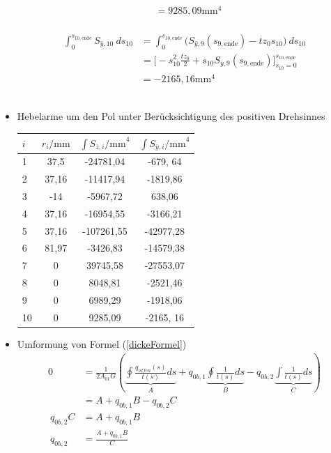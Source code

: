 \begin{itemize}
\begin{equation}
\begin{split}
			&=9285,09\mathrm{mm}^4
		\end{split}
	\end{equation}\\
	\begin{equation}
		\begin{split}
			\int_{0}^{s_{10,\mathrm{ende}}} S_{\bar y,10}\ ds_{10} &= \int_{0}^{s_{10,\mathrm{ende}}}\bigg(S_{\bar y,9}(s_{9,\mathrm{ende}})-tz_0s_{10}\bigg)\ ds_{10}\\\
			&=\bigg[-s_{10}^2\frac{tz_0}{2}+s_{10}S_{\bar y,9}(s_{9,\mathrm{ende}})\bigg]_{s_{10}=0}^{s_{10,\mathrm{ende}}}\\\
			&=-2165,16\mathrm{mm}^4
		\end{split}
	\end{equation}\\
\item Hebelarme um den Pol unter Berücksichtigung des positiven Drehsinnes
\begin{center}
\begin{tabular}[h]{l|c|c|c}
	$i$&$r_i\mathrm{/mm}$&$\int S_{\bar z,i}\mathrm{/mm}^4$&$\int S_{\bar y,i}\mathrm{/mm}^4$\\
	\hline
	1&37,5&-24781,04&-679, 64\\
	2&37,16&-11417,94&-1819,86\\
	3&-14&-5967,72&638,06\\
	4&37,16&-16954,55&-3166,21\\
	5&37,16&-107261,55&-42977,28\\
	6&81,97&-3426,83&-14579,38\\
	7&0&39745,58&-27553,07\\
	8&0&8048,81&-2521,46\\
	9&0&6989,29&-1918,06\\
	10&0&9285,09&-2165, 16\\
\end{tabular}
\end{center}
	\item Umformung von Formel (\ref{dickeFormel})
	\begin{equation}
		\begin{split}
			0 &= \frac{1}{2A_{01}G}(\underbrace{\oint\frac{q_{offen}(s)}{t(s)}ds}_A+q_{0b,1}\underbrace{\oint\frac{1}{t(s)}ds}_B-q_{0b,2}\underbrace{\int\frac{1}{t(s)}ds}_C)\\\
			&=A+q_{0b,1}B-q_{0b,2}C\\\
		q_{0b,2}C&=A+q_{0b,1}B\\\
		q_{0b,2}&=\frac{A+q_{0b,1}B}{C}
		\end{split}

\end{equation}
\end{itemize}
